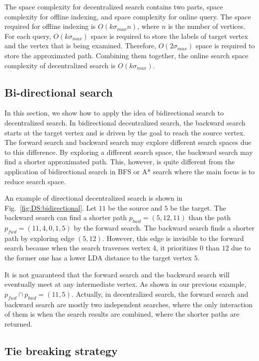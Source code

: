 The space complexity for decentralized search contains two parts, space complexity for offline indexing, and space complexity for online query. The space required for offline indexing is $O(k{\sigma}_{max}n)$, where $n$ is the number of vertices. For each query, $O(k{\sigma}_{max})$ space is required to store the labels of target vertex and the vertex that is being examined. Therefore, $O(2{\sigma}_{max})$ space is required to store the approximated path. Combining them together, the online search space complexity of decentralized search is $O(k{\sigma}_{max})$.

\subsection{Bi-directional search}

In this section, we show how to apply the idea of bidirectional search to decentralized search. In bidirectional decentralized search, the backward search starts at the target vertex and is driven by the goal to reach the source vertex. The forward search and backward search may explore different search spaces due to this difference. By exploring a different search space, the backward search may find a shorter approximated path. This, however, is quite different from the application of bidirectional search in BFS or A* search where the main focus is to reduce search space.

An example of directional decentralized search is shown in Fig.~\ref{fig:DS:bidirectional}. Let $11$ be the source and $5$ be the target. The backward search can find a shorter path $p_{bwd} = (5, 12, 11)$ than the path $p_{fwd} = (11, 4, 0, 1, 5)$ by the forward search. The backward search finds a shorter path by exploring edge $(5, 12)$. However, this edge is invisible to the forward search because when the search traverses vertex $4$, it prioritizes $0$ than $12$ due to the former one has a lower LDA distance to the target vertex $5$.

It is not guaranteed that the forward search and the backward search will eventually meet at any intermediate vertex. As shown in our previous example, $p_{fwd} \cap p_{bwd} = (11, 5)$. Actually, in decentralized search, the forward search and backward search are mostly two independent searches, where the only interaction of them is when the search results are combined, where the shorter paths are returned. 

\subsection{Tie breaking strategy}

